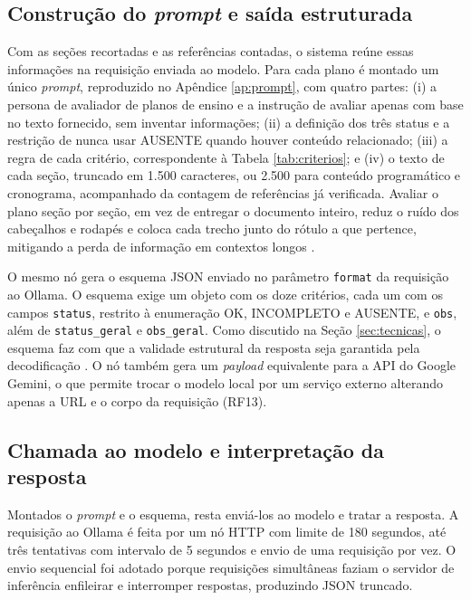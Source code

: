 \subsection{Construção do \textit{prompt} e saída estruturada}

Com as seções recortadas e as referências contadas, o sistema reúne essas informações na requisição enviada ao modelo. Para cada plano é montado um único \textit{prompt}, reproduzido no Apêndice \ref{ap:prompt}, com quatro partes: (i) a persona de avaliador de planos de ensino e a instrução de avaliar apenas com base no texto fornecido, sem inventar informações; (ii) a definição dos três status e a restrição de nunca usar AUSENTE quando houver conteúdo relacionado; (iii) a regra de cada critério, correspondente à Tabela \ref{tab:criterios}; e (iv) o texto de cada seção, truncado em 1.500 caracteres, ou 2.500 para conteúdo programático e cronograma, acompanhado da contagem de referências já verificada. Avaliar o plano seção por seção, em vez de entregar o documento inteiro, reduz o ruído dos cabeçalhos e rodapés e coloca cada trecho junto do rótulo a que pertence, mitigando a perda de informação em contextos longos \cite{Liu2024}.

O mesmo nó gera o esquema JSON enviado no parâmetro \texttt{format} da requisição ao Ollama. O esquema exige um objeto com os doze critérios, cada um com os campos \texttt{status}, restrito à enumeração OK, INCOMPLETO e AUSENTE, e \texttt{obs}, além de \texttt{status\_geral} e \texttt{obs\_geral}. Como discutido na Seção \ref{sec:tecnicas}, o esquema faz com que a validade estrutural da resposta seja garantida pela decodificação \cite{Willard2023, OllamaStructured}. O nó também gera um \textit{payload} equivalente para a API do Google Gemini, o que permite trocar o modelo local por um serviço externo alterando apenas a URL e o corpo da requisição (RF13).

\subsection{Chamada ao modelo e interpretação da resposta}

Montados o \textit{prompt} e o esquema, resta enviá-los ao modelo e tratar a resposta. A requisição ao Ollama é feita por um nó HTTP com limite de 180 segundos, até três tentativas com intervalo de 5 segundos e envio de uma requisição por vez. O envio sequencial foi adotado porque requisições simultâneas faziam o servidor de inferência enfileirar e interromper respostas, produzindo JSON truncado.

